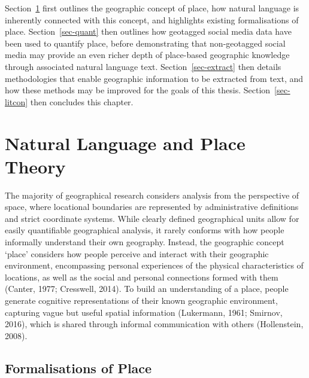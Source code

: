 \documentclass[
  letterpaper,
  11pt,
  english,
  onehalfspacing,
  headsepline]{MastersDoctoralThesis}
\begin{document}
Section~\ref{sec-theory} first outlines the geographic concept of place,
how natural language is inherently connected with this concept, and
highlights existing formalisations of place. Section~\ref{sec-quant}
then outlines how geotagged social media data have been used to quantify
place, before demonstrating that non-geotagged social media may provide
an even richer depth of place-based geographic knowledge through
associated natural language text. Section~\ref{sec-extract} then details
methodologies that enable geographic information to be extracted from
text, and how these methods may be improved for the goals of this
thesis. Section~\ref{sec-litcon} then concludes this chapter.

\hypertarget{sec-theory}{%
\section{Natural Language and Place Theory}\label{sec-theory}}

The majority of geographical research considers analysis from the
perspective of space, where locational boundaries are represented by
administrative definitions and strict coordinate systems. While clearly
defined geographical units allow for easily quantifiable geographical
analysis, it rarely conforms with how people informally understand their
own geography. Instead, the geographic concept `place' considers how
people perceive and interact with their geographic environment,
encompassing personal experiences of the physical characteristics of
locations, as well as the social and personal connections formed with
them (Canter, 1977; Cresswell, 2014). To build an understanding of a
place, people generate cognitive representations of their known
geographic environment, capturing vague but useful spatial information
(Lukermann, 1961; Smirnov, 2016), which is shared through informal
communication with others (Hollenstein, 2008).

\hypertarget{formalisations-of-place}{%
\subsection{Formalisations of Place}\label{formalisations-of-place}}
\end{document}
